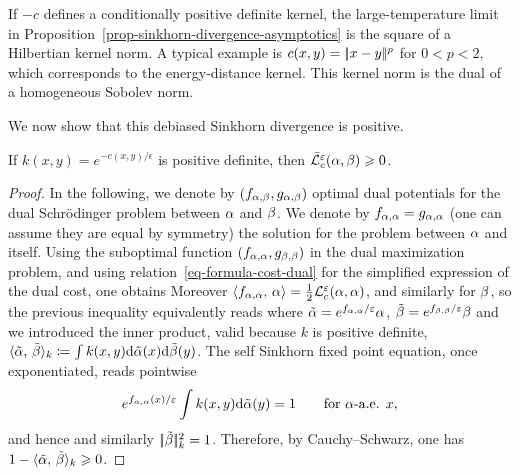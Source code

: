\begin{rem}
	If $-c$ defines a conditionally positive definite kernel, the large-temperature limit in Proposition~\ref{prop-sinkhorn-divergence-asymptotics} is the square of a Hilbertian kernel norm. A typical example is $c(x,y)=|\!| x-y |\!|^p$ for $0 < p < 2$, which corresponds to the energy-distance kernel. This kernel norm is the dual of a homogeneous Sobolev norm.
\end{rem}

We now show that this debiased Sinkhorn divergence is positive.

\begin{prop}\label{prop-sinkhorn-positive}
	If $k(x,y)=e^{-c(x,y)/\epsilon}$ is positive definite, then $\bar{\mathcal{L}}_c^\varepsilon(\alpha,\beta) \geqslant 0$.
\end{prop}

\begin{proof}
	In the following, we denote by $(f_{\alpha,\beta},g_{\alpha,\beta})$ optimal dual potentials for the
	dual Schr\"odinger problem between $\alpha$ and $\beta$.
	We denote by $f_{\alpha,\alpha}=g_{\alpha,\alpha}$ (one can assume they are equal by symmetry) the solution for the problem between $\alpha$ and itself.
	Using the suboptimal function $(f_{\alpha,\alpha},g_{\beta,\beta})$ in the dual maximization problem, and using relation~\eqref{eq-formula-cost-dual} for the simplified expression of the dual cost, one obtains
	Moreover $\langle f_{\alpha,\alpha},\,\alpha\rangle = \frac{1}{2}\mathcal{L}_c^\varepsilon(\alpha,\alpha)$, and similarly for $\beta$, so the previous inequality equivalently reads
		where $\tilde{\alpha}=e^{f_{\alpha,\alpha}/\varepsilon} \alpha$, $\tilde{\beta}=e^{f_{\beta,\beta}/\varepsilon} \beta$
		and we introduced the inner product, valid because $k$ is positive definite,
	$\langle \tilde{\alpha},\,\tilde{\beta}\rangle_{k} \coloneqq \int k(x,y) \mathrm{d}\tilde{\alpha}(x) \mathrm{d}\tilde{\beta}(y)$.
	The self Sinkhorn fixed point equation, once exponentiated, reads pointwise
	\[
		e^{f_{\alpha,\alpha}(x)/\varepsilon}\int k(x,y)\mathrm{d}\tilde{\alpha}(y)=1
		\qquad \text{for }\alpha\text{-a.e. }x,
	\]
	and hence
		and similarly $|\!| \tilde {\beta} |\!|_k^2=1$. Therefore, by Cauchy--Schwarz, one has
	$1 - \langle \tilde{\alpha},\,\tilde{\beta}\rangle_{k} \geqslant 0$.
\end{proof}

